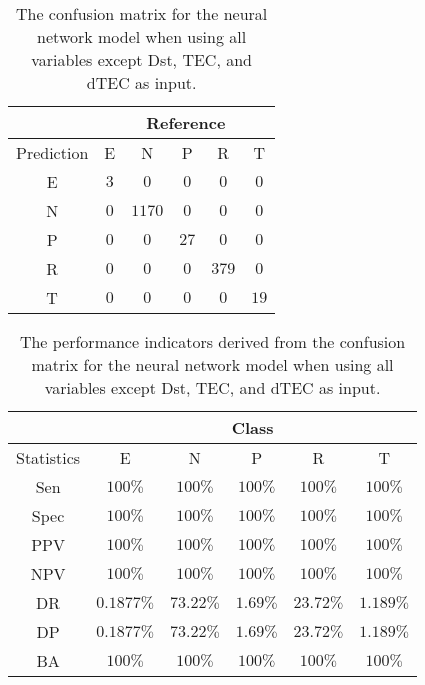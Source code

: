 \begin{table}[!ht]
	\centering
	\begin{tabular}{|c|c|c|c|c|c|}
		\hline
		 & \multicolumn{5}{|c|}{Reference} \\ \hline
		 Prediction & E & N & P & R & T \\ \hline
		 E & $3$ & $0$ & $0$ & $0$ & $0$ \\ \hline
		 N & $0$ & $1170$ & $0$ & $0$ & $0$ \\ \hline
		 P & $0$ & $0$ & $27$ & $0$ & $0$ \\ \hline
		 R & $0$ & $0$ & $0$ & $379$ & $0$ \\ \hline
		 T & $0$ & $0$ & $0$ & $0$ & $19$ \\ \hline
	\end{tabular}
	\caption{The confusion matrix for the neural network model when using all variables except Dst, TEC, and dTEC as input.}
	\label{tab:cm:noTEC:nnet}
\end{table}

\begin{table}[!ht]
	\centering
	\begin{tabular}{|c|c|c|c|c|c|}
		\hline
		 & \multicolumn{5}{c|}{Class} \\ \hline
		Statistics & E & N & P & R & T \\ \hline
		Sen & $100\%$ & $100\%$ & $100\%$ & $100\%$ & $100\%$ \\ \hline
		Spec & $100\%$ & $100\%$ & $100\%$ & $100\%$ & $100\%$ \\ \hline
		PPV & $100\%$ & $100\%$ & $100\%$ & $100\%$ & $100\%$ \\ \hline
		NPV & $100\%$ & $100\%$ & $100\%$ & $100\%$ & $100\%$ \\ \hline
		DR & $0.1877\%$ & $73.22\%$ & $1.69\%$ & $23.72\%$ & $1.189\%$ \\ \hline
		DP & $0.1877\%$ & $73.22\%$ & $1.69\%$ & $23.72\%$ & $1.189\%$ \\ \hline
		BA & $100\%$ & $100\%$ & $100\%$ & $100\%$ & $100\%$ \\ \hline
	\end{tabular}
	\caption{The performance indicators derived from the confusion matrix for the neural network model when using all variables except Dst, TEC, and dTEC as input.}
	\label{tab:cs:reverse:noTEC:nnet}
\end{table}

